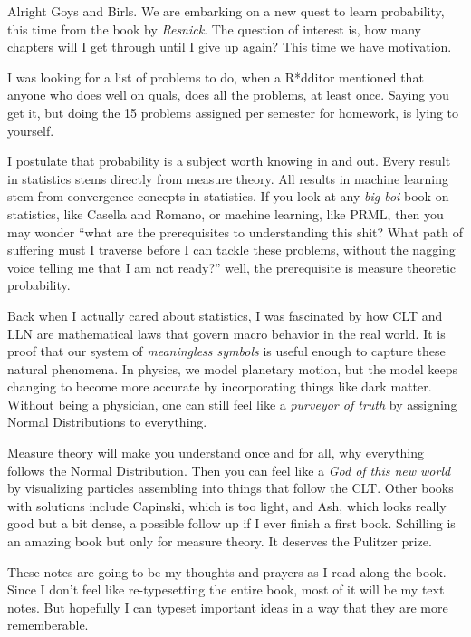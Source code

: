 \documentclass{article}
\begin{document}
\begin{flushleft}
\qquad Alright Goys and Birls. We are embarking on a new quest to learn probability, this time from the book by \emph{Resnick}. The question of interest is, how many chapters will I get through until I give up again? This time we have motivation. 

\qquad I was looking for a list of problems to do, when a R*dditor mentioned that anyone who does well on quals, does all the problems, at least once. Saying you get it, but doing the 15 problems assigned per semester for homework, is lying to yourself. 

\qquad I postulate that probability is a subject worth knowing in and out. Every result in statistics stems directly from measure theory. All results in machine learning stem from convergence concepts in statistics. If you look at any \emph{big boi} book on statistics, like Casella and Romano, or machine learning, like PRML, then you may wonder ``what are the prerequisites to understanding this shit? What path of suffering must I traverse before I can tackle these problems, without the nagging voice telling me that I am not ready?'' well, the prerequisite is measure theoretic probability. 

\qquad Back when I actually cared about statistics, I was fascinated by how CLT and LLN are mathematical laws that govern macro behavior in the real world. It is proof that our system of \emph{meaningless symbols} is useful enough to capture these natural phenomena. In physics, we model planetary motion, but the model keeps changing to become more accurate by incorporating things like dark matter. Without being a physician, one can still feel like a \emph{purveyor of truth} by assigning Normal Distributions to everything. 

\qquad Measure theory will make you understand once and for all, why everything follows the Normal Distribution. Then you can feel like a \emph{God of this new world} by visualizing particles assembling into things that follow the CLT. Other books with solutions include Capinski, which is too light, and Ash, which looks really good but a bit dense, a possible follow up if I ever finish a first book. Schilling is an amazing book but only for measure theory. It deserves the Pulitzer prize. 

\qquad These notes are going to be my thoughts and prayers as I read along the book. Since I don't feel like re-typesetting the entire book, most of it will be my text notes. But hopefully I can typeset important ideas in a way that they are more rememberable.




\end{flushleft}
\end{document}
